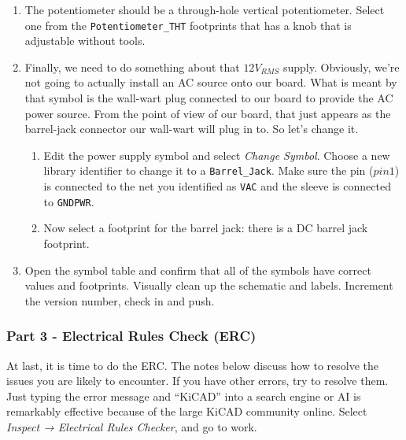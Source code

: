 \documentclass[
  letterpaper,
  DIV=11,
  numbers=noendperiod,
  oneside]{scrartcl}
\providecommand{\tightlist}{%
  \setlength{\itemsep}{0pt}\setlength{\parskip}{0pt}}\usepackage{longtable,booktabs,array}
\begin{document}
\begin{enumerate}
  may also look at some of the standard slide switches and see if you
  can find it in the vendor library. If you can't match them, you can
  pick a slide switch whose footprint is available for download. (Hint:
  most footprints in the KiCAD library have links to the vendor.)
\item
  The potentiometer should be a through-hole vertical potentiometer.
  Select one from the \texttt{Potentiometer\_THT} footprints that has a
  knob that is adjustable without tools.
\item
  Finally, we need to do something about that \(12V_{RMS}\) supply.
  Obviously, we're not going to actually install an AC source onto our
  board. What is meant by that symbol is the wall-wart plug connected to
  our board to provide the AC power source. From the point of view of
  our board, that just appears as the barrel-jack connector our
  wall-wart will plug in to. So let's change it.

  \begin{enumerate}
  \def\labelenumii{\alph{enumii}.}
  \tightlist
  \item
    Edit the power supply symbol and select \emph{Change Symbol}. Choose
    a new library identifier to change it to a \texttt{Barrel\_Jack}.
    Make sure the pin (\(pin 1\)) is connected to the net you identified
    as \texttt{VAC} and the sleeve is connected to \texttt{GNDPWR}.
  \item
    Now select a footprint for the barrel jack: there is a DC barrel
    jack footprint.
  \end{enumerate}
\item
  Open the symbol table and confirm that all of the symbols have correct
  values and footprints. Visually clean up the schematic and labels.
  Increment the version number, check in and push.
\end{enumerate}

\subsubsection{Part 3 - Electrical Rules Check
(ERC)}\label{part-3---electrical-rules-check-erc}

At last, it is time to do the ERC. The notes below discuss how to
resolve the issues you are likely to encounter. If you have other
errors, try to resolve them. Just typing the error message and ``KiCAD''
into a search engine or AI is remarkably effective because of the large
KiCAD community online. Select \emph{Inspect → Electrical Rules
Checker}, and go to work.
\end{document}
